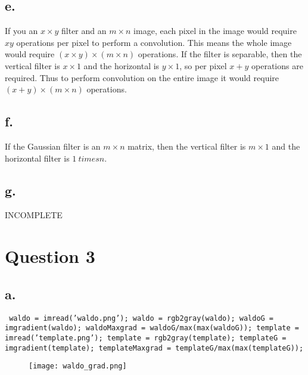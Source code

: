 \documentclass{article}
\begin{document}
\newpage
\subsection*{e.}
If you an $x \times y$ filter and an $m \times n$ image, each pixel in the image would require $xy$ operations per pixel to perform a convolution. This means the whole image would require $(x\times y) \times (m \times n) $ operations. If the filter is separable, then the vertical filter is $x \times 1$ and the horizontal is $y \times 1$, so per pixel $x+y$ operations are required. Thus to perform convolution on the entire image it would require $(x + y) \times (m \times n)$ operations.

\subsection*{f.}
If the Gaussian filter is an $m \times n$ matrix, then the vertical filter is $m \times 1$ and the horizontal filter is $1 \ times n$.

\subsection*{g.}
INCOMPLETE

\section*{Question 3}
\subsection*{a.}
\texttt{
\newline\noindent
waldo = imread('waldo.png');
\newline
waldo = rgb2gray(waldo);
\newline
waldoG = imgradient(waldo);
\newline
waldoMaxgrad =  waldoG/max(max(waldoG));
\newline\newline
template = imread('template.png');
\newline
template = rgb2gray(template);
\newline
templateG = imgradient(template);
\newline
templateMaxgrad =  templateG/max(max(templateG));
}

\begin{figure}[h!]
\centering
\texttt{[image: waldo\_grad.png]}
\label{fig:sample graph}
\end{figure}
\end{document}
